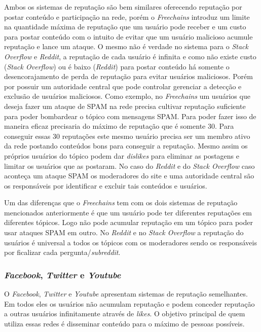 \documentclass[12pt]{article}
\newcommand{\FC} {\textit{Freechains}\xspace}
\begin{document}
Ambos os sistemas de reputação são bem similares oferecendo reputação por postar conteúdo e participação na rede, porém o \FC introduz um limite na quantidade máxima de reputação que um usuário pode receber e um custo para postar conteúdo com o intuito de evitar que um usuário malicioso acumule reputação e lance um ataque.
O mesmo não é verdade no sistema para o \textit{Stack Overflow} e \textit{Reddit}, a reputação de cada usuário é infinita e como não existe custo (\textit{Stack Overflow}) ou é baixo (\textit{Reddit}) para postar conteúdo há somente o desencorajamento de perda de reputação para evitar usuários maliciosos.
Porém por possuir um autoridade central que pode controlar gerenciar a detecção e exclusão de usuários maliciosos.
Como exemplo, no \FC um usuários que deseja fazer um ataque de SPAM na rede precisa cultivar reputação suficiente para poder bombardear o tópico com mensagens SPAM.
Para poder fazer isso de maneira eficaz precisaria do máximo de reputação que é somente 30.
Para conseguir essas 30 reputações este mesmo usuário precisa ser um membro ativo da rede postando conteúdos bons para conseguir a reputação.
Mesmo assim os próprios usuários do tópico podem dar \textit{dislikes} para eliminar as postagens e limitar os usuários que as postaram.
No caso do \textit{Reddit} e do \textit{Stack Overflow} caso aconteça um ataque SPAM os moderadores do site e uma autoridade central são os responsáveis por identificar e excluir tais conteúdos e usuários.

Um das diferenças que o \FC tem com os dois sistemas de reputação mencionados anteriormente é que um usuário pode ter diferentes reputações em diferentes tópicos.
Logo não pode acumular reputação em um tópico para poder usar ataques SPAM em outro.
No \textit{Reddit} e no \textit{Stack Overflow} a reputação do usuários é universal a todos os tópicos com os moderadores sendo os responsáveis por ficalizar cada pergunta/\textit{subreddit}.

\subsubsection{\textit{Facebook}, \textit{Twitter} e \textit{Youtube}} \label{subsub:facetwitteryoutube}

O \textit{Facebook}, \textit{Twitter} e \textit{Youtube} apresentam sistemas de reputação semelhantes.
Em todos eles os usuários não acumulam reputação e podem conceder reputação a outras usuários infinitamente através de \textit{likes}.
O objetivo principal de quem utiliza essas redes é disseminar conteúdo para o máximo de pessoas possíveis.
\end{document}
